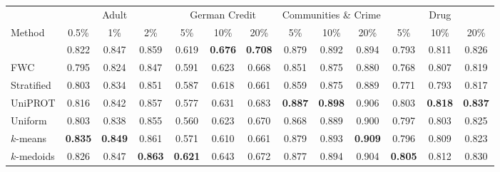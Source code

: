\begin{tabular}{lcccccccccccc}
\toprule
 & \multicolumn{3}{c}{Adult} & \multicolumn{3}{c}{German Credit} & \multicolumn{3}{c}{Communities \& Crime} & \multicolumn{3}{c}{Drug}\\
\cmidrule(lr){2-4} \cmidrule(lr){5-7} \cmidrule(lr){8-10} \cmidrule(lr){11-13}
Method & 0.5\% & 1\% & 2\% & 5\% & 10\% & 20\% & 5\% & 10\% & 20\% & 5\% & 10\% & 20\%\\
\midrule
\method{} & 0.822 & 0.847 & 0.859 & 0.619 & \textbf{0.676} & \textbf{0.708} & 0.879 & 0.892 & 0.894 & 0.793 & 0.811 & 0.826\\
FWC & 0.795 & 0.824 & 0.847 & 0.591 & 0.623 & 0.668 & 0.851 & 0.875 & 0.880 & 0.768 & 0.807 & 0.819\\
Stratified & 0.803 & 0.834 & 0.851 & 0.587 & 0.618 & 0.661 & 0.859 & 0.875 & 0.889 & 0.771 & 0.793 & 0.817\\
UniPROT & 0.816 & 0.842 & 0.857 & 0.577 & 0.631 & 0.683 & \textbf{0.887} & \textbf{0.898} & 0.906 & 0.803 & \textbf{0.818} & \textbf{0.837}\\
Uniform & 0.803 & 0.838 & 0.855 & 0.560 & 0.623 & 0.670 & 0.868 & 0.889 & 0.900 & 0.797 & 0.803 & 0.825\\
$k$-means & \textbf{0.835} & \textbf{0.849} & 0.861 & 0.571 & 0.610 & 0.661 & 0.879 & 0.893 & \textbf{0.909} & 0.796 & 0.809 & 0.823\\
$k$-medoids & 0.826 & 0.847 & \textbf{0.863} & \textbf{0.621} & 0.643 & 0.672 & 0.877 & 0.894 & 0.904 & \textbf{0.805} & 0.812 & 0.830\\
\bottomrule
\end{tabular}
